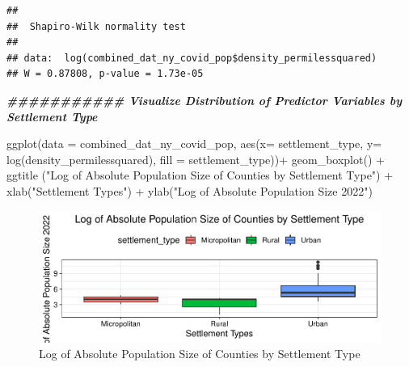 \documentclass[
  12pt,
]{article}
\newenvironment{Shaded}{\begin{snugshade}}{\end{snugshade}}
\newcommand{\AttributeTok}[1]{\textcolor[rgb]{0.77,0.63,0.00}{#1}}
\newcommand{\CommentTok}[1]{\textcolor[rgb]{0.56,0.35,0.01}{\textit{#1}}}
\newcommand{\DocumentationTok}[1]{\textcolor[rgb]{0.56,0.35,0.01}{\textbf{\textit{#1}}}}
\newcommand{\FunctionTok}[1]{\textcolor[rgb]{0.00,0.00,0.00}{#1}}
\newcommand{\NormalTok}[1]{#1}
\newcommand{\SpecialCharTok}[1]{\textcolor[rgb]{0.00,0.00,0.00}{#1}}
\newcommand{\StringTok}[1]{\textcolor[rgb]{0.31,0.60,0.02}{#1}}
\begin{document}
\begin{Shaded}
\end{Shaded}

\begin{verbatim}
## 
##  Shapiro-Wilk normality test
## 
## data:  log(combined_dat_ny_covid_pop$density_permilessquared)
## W = 0.87808, p-value = 1.73e-05
\end{verbatim}

\begin{Shaded}
\begin{Highlighting}[]
\DocumentationTok{\#\#\#\#\#\#\#\#\#\#\# Visualize Distribution of Predictor Variables by Settlement Type}

\FunctionTok{ggplot}\NormalTok{(}\AttributeTok{data =}\NormalTok{ combined\_dat\_ny\_covid\_pop, }\FunctionTok{aes}\NormalTok{(}\AttributeTok{x=}\NormalTok{ settlement\_type, }\AttributeTok{y=} \FunctionTok{log}\NormalTok{(density\_permilessquared), }\AttributeTok{fill =}\NormalTok{ settlement\_type))}\SpecialCharTok{+}
  \FunctionTok{geom\_boxplot}\NormalTok{() }\SpecialCharTok{+}
  \FunctionTok{ggtitle}\NormalTok{ (}\StringTok{"Log of Absolute Population Size of Counties by Settlement Type"}\NormalTok{) }\SpecialCharTok{+}
  \FunctionTok{xlab}\NormalTok{(}\StringTok{"Settlement Types"}\NormalTok{) }\SpecialCharTok{+}
  \FunctionTok{ylab}\NormalTok{(}\StringTok{"Log of Absolute Population Size 2022"}\NormalTok{)}
\end{Highlighting}
\end{Shaded}

\begin{figure}

\includegraphics{EDA_Final_Group_Project_files/figure-latex/unnamed-chunk-12-1} \hfill{}

\caption{Log of Absolute Population Size of Counties by Settlement Type}\label{fig:unnamed-chunk-12}
\end{figure}
\end{document}
